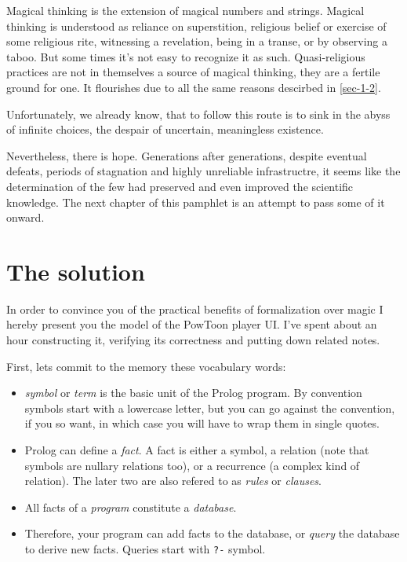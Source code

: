 \documentclass[11pt]{article}
\begin{document}
Magical thinking is the extension of magical numbers and strings.  Magical
thinking is understood as reliance on superstition, religious belief or
exercise of some religious rite, witnessing a revelation, being in a transe,
or by observing a taboo.  But some times it's not easy to recognize it as
such.  Quasi-religious practices are not in themselves a source of magical
thinking, they are a fertile ground for one.  It flourishes due to all the
same reasons descirbed in \ref{sec-1-2}.

Unfortunately, we already know, that to follow this route is to sink in the
abyss of infinite choices, the despair of uncertain, meaningless existence.

Nevertheless, there is hope.  Generations after generations, despite eventual
defeats, periods of stagnation and highly unreliable infrastructre, it seems
like the determination of the few had preserved and even improved the
scientific knowledge.  The next chapter of this pamphlet is an attempt to
pass some of it onward.

\newpage
\section{The solution}
\label{sec-2}

In order to convince you of the practical benefits of formalization over magic
I hereby present you the model of the PowToon player UI.  I've spent about an
hour constructing it, verifying its correctness and putting down related
notes.

First, lets commit to the memory these vocabulary words:

\begin{itemize}
\item \emph{symbol} or \emph{term} is the basic unit of the Prolog program.  By convention
symbols start with a lowercase letter, but you can go against the
convention, if you so want, in which case you will have to wrap them in
single quotes.
\item Prolog can define a \emph{fact}.  A fact is either a symbol, a relation (note that
symbols are nullary relations too), or a recurrence (a complex kind of
relation).  The later two are also refered to as \emph{rules} or \emph{clauses}.
\item All facts of a \emph{program} constitute a \emph{database}.
\item Therefore, your program can add facts to the database, or \emph{query} the database
to derive new facts.  Queries start with \texttt{?-} symbol.
\end{itemize}
\end{document}

